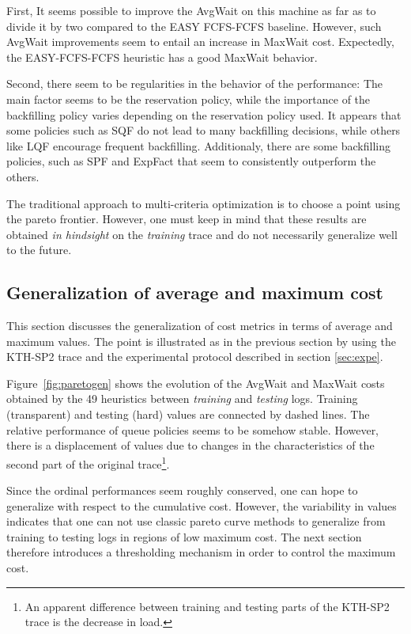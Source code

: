First, It seems possible to improve the AvgWait on this machine as far
as to divide it by two compared to the EASY FCFS-FCFS baseline. However, such
AvgWait improvements seem to entail an increase in MaxWait
cost. Expectedly, the EASY-FCFS-FCFS heuristic has a good MaxWait behavior.

Second, there seem to be regularities in the behavior of the performance: The
main factor seems to be the reservation policy, while the importance of the
backfilling policy varies depending on the reservation policy used. It appears
that some policies such as SQF do not lead to many backfilling decisions, while
others like LQF encourage frequent backfilling. Additionaly, there are some
backfilling policies, such as SPF and ExpFact that seem to consistently
outperform the others.

The traditional approach to multi-criteria optimization is to choose a point
using the pareto frontier. However, one must keep in mind that these results
are obtained \textit{in hindsight} on the \textit{training} trace and do not
necessarily generalize well to the future.

\subsection{Generalization of average and maximum cost}

This section discusses the generalization of cost metrics in terms of average
and maximum values. The point is illustrated as in the previous section by
using the KTH-SP2 trace and the experimental protocol described in section
\ref{sec:expe}.


Figure~\ref{fig:paretogen} shows the evolution of the AvgWait and MaxWait costs
obtained by the 49 heuristics between \textit{training} and \textit{testing}
logs. Training (transparent) and testing (hard) values are connected by
dashed lines. The relative performance of queue policies seems to be somehow
stable. However, there is a displacement of values due to changes in the
characteristics of the second part of the original trace\footnote{An apparent
  difference between training and testing parts of the KTH-SP2 trace is the
decrease in load.}.

Since the ordinal performances seem roughly conserved, one can hope to
generalize with respect to the cumulative cost. However, the variability in
values indicates that one can not use classic pareto curve methods to
generalize from training to testing logs in regions of low maximum cost. The
next section therefore introduces a thresholding mechanism in order to control
the maximum cost.

